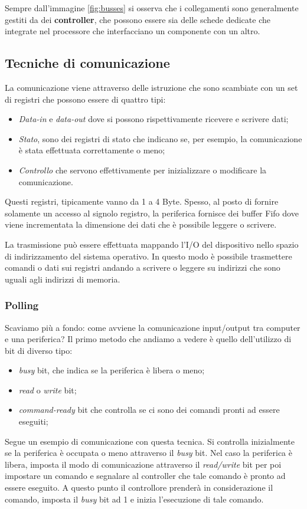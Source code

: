 Sempre dall'immagine \ref{fig:busses} si osserva che i collegamenti sono generalmente gestiti da dei \textbf{controller}, che possono essere sia delle schede dedicate che integrate nel processore che interfacciano un componente con un altro.

% 
\subsection{Tecniche di comunicazione}
La comunicazione viene attraverso delle istruzione che sono scambiate con un set di registri che possono essere di quattro tipi:
\vspace{-5px}
\begin{itemize}
\setlength{\itemsep}{-.15 em}
    \item \textit{Data-in} e \textit{data-out} dove si possono rispettivamente ricevere e scrivere dati;
    \item \textit{Stato}, sono dei registri di stato che indicano se, per esempio, la comunicazione è stata effettuata correttamente o meno;
    \item \textit{Controllo} che servono effettivamente per inizializzare o modificare la comunicazione.
\end{itemize}
Questi registri, tipicamente vanno da 1 a 4 Byte. Spesso, al posto di fornire solamente un accesso al signolo registro, la periferica fornisce dei buffer Fifo dove viene incrementata la dimensione dei dati che è possibile leggere o scrivere. 

La trasmissione può essere effettuata mappando l'I/O del dispositivo nello spazio di indirizzamento del sistema operativo. In questo modo è possibile trasmettere comandi o dati sui registri andando a scrivere o leggere su indirizzi che sono uguali agli indirizzi di memoria. 
% 
\subsubsection{Polling}
Scaviamo più a fondo: come avviene la comunicazione input/output tra computer e una periferica? Il primo metodo che andiamo a vedere è quello dell'utilizzo di bit di diverso tipo:
\vspace{-5px}
\begin{itemize}
\setlength{\itemsep}{-.15 em}
    \item \textit{busy} bit, che indica se la periferica è libera o meno;
    \item \textit{read} o \textit{write} bit;
    \item \textit{command-ready} bit che controlla se ci sono dei comandi pronti ad essere eseguiti;
\end{itemize}
Segue un esempio di comunicazione con questa tecnica. Si controlla inizialmente se la periferica è occupata o meno attraverso il \textit{busy} bit. Nel caso la periferica è libera, imposta il modo di comunicazione attraverso il \textit{read/write} bit per poi impostare un comando e segnalare al controller che tale comando è pronto ad essere eseguito. A questo punto il controllore prenderà in considerazione il comando, imposta il \textit{busy} bit ad 1 e inizia l'esecuzione di tale comando.


